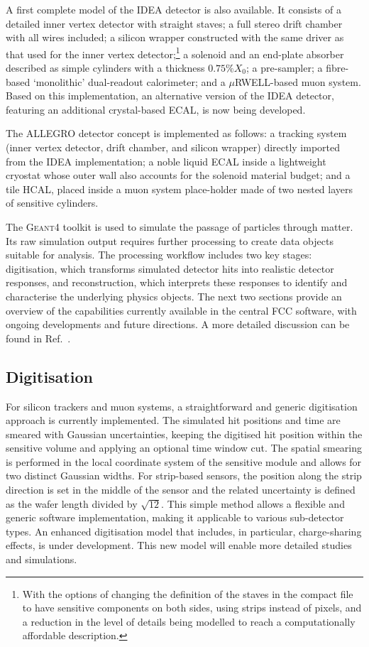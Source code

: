 A first complete model of the IDEA detector is also available. It consists of a detailed inner vertex detector with straight staves; a full stereo drift chamber with all wires included; a silicon wrapper constructed with the same driver as that used for the inner vertex detector;\footnote{With the options of changing the definition of the staves in the compact file to have sensitive components on both sides, using strips instead of pixels, and a reduction in the level of details being modelled to reach a computationally affordable description.} a solenoid and an end-plate absorber described as simple cylinders with a thickness $0.75\% X_0$; a pre-sampler; a fibre-based `monolithic' dual-readout calorimeter; and a $\mu$RWELL-based muon system. Based on this implementation, an alternative version of the IDEA detector, featuring an additional crystal-based ECAL, is now being developed.

The ALLEGRO detector concept is implemented as follows: a tracking system (inner vertex detector, drift chamber, and silicon wrapper) directly imported from the IDEA implementation; a noble liquid ECAL inside a lightweight cryostat whose outer wall also accounts for the solenoid material budget;  and a tile HCAL, placed inside a muon system place-holder made of two nested layers of sensitive cylinders.

The \textsc{Geant4} toolkit is used to simulate the passage of particles through matter. 
Its raw simulation output requires further processing to create data objects suitable for analysis. 
The processing workflow includes two key stages: 
digitisation, which transforms simulated detector hits into realistic detector responses, 
and reconstruction, which interprets these responses to identify and characterise the underlying physics objects. 
The next two sections provide an overview of the capabilities currently available in the central FCC software,
with ongoing developments and future directions. 
A more detailed discussion can be found in Ref.~\cite{softwareNote}.

\subsection{Digitisation} 
\label{sec:digi}

For silicon trackers and muon systems, a straightforward and generic digitisation approach is currently implemented. 
The simulated hit positions and time are smeared with Gaussian uncertainties, 
keeping the digitised hit position within the sensitive volume and applying an optional time window cut. 
The spatial smearing is performed in the local coordinate system of the sensitive module and allows for two distinct Gaussian widths. 
For strip-based sensors, the position along the strip direction is set in the middle of the sensor 
and the related uncertainty is defined as the wafer length divided by $\sqrt{12}$. 
This simple method allows a flexible and generic software implementation, making it applicable to various sub-detector types. 
An enhanced digitisation model that includes, in particular, charge-sharing effects, is under development. 
This new model will enable more detailed studies and simulations.

